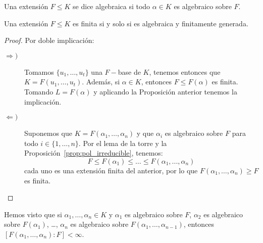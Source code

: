 \begin{definicion}
    Una extensión $F\leq K$ se dice algebraica si todo $\alpha\in K$ es algebraico sobre $F$.
\end{definicion}

\begin{teo}\label{teo:finita_algebraica}
    Una extensión $F\leq K$ es finita si y solo si es algebraica y finitamente generada.
    \begin{proof}
        Por doble implicación:
        \begin{description}
            \item [$\Longrightarrow )$] Tomamos $\{u_1, \ldots, u_t\}$ una $F-$base de $K$, tenemos entonces que $K = F(u_1, \ldots, u_t)$. Además, si $\alpha\in K$, entonces $F\leq F(\alpha)$ es finita. Tomando $L = F(\alpha)$ y aplicando la Proposición anterior tenemos la implicación.
            \item [$\Longleftarrow )$] Suponemos que $K = F(\alpha_1, \ldots, \alpha_n)$ y que $\alpha_i$ es algebraico sobre $F$ para todo $i\in \{1,\ldots,n\}$. Por el lema de la torre y la Proposición~\ref{prop:pol_irreducible}, tenemos:
                \begin{equation*}
                    F\leq F(\alpha_1) \leq \ldots \leq F(\alpha_1, ..., \alpha_n) 
                \end{equation*}
                cada uno es una extensión finita del anterior, por lo que $F(\alpha_1, \ldots, \alpha_n)\geq F$ es finita.
        \end{description}
    \end{proof}
\end{teo}

\begin{observacion}
    Hemos visto que si $\alpha_1, \ldots, \alpha_n\in K$ y $\alpha_1$ es algebraico sobre $F$, $\alpha_2 $ es algebraico sobre $F(\alpha_1)$, \ldots, $\alpha_n$ es algebraico sobre $F(\alpha_1, \ldots, \alpha_{n-1})$, entonces $[F(\alpha_1, \ldots, \alpha_n) : F] < \infty$.
\end{observacion}

